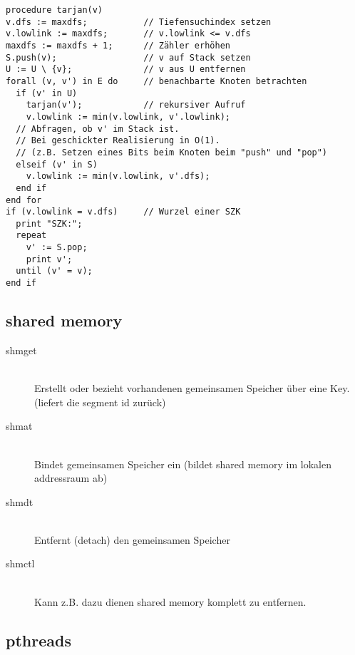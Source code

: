 \begin{verbatim}
procedure tarjan(v)
v.dfs := maxdfs;           // Tiefensuchindex setzen
v.lowlink := maxdfs;       // v.lowlink <= v.dfs
maxdfs := maxdfs + 1;      // Zähler erhöhen
S.push(v);                 // v auf Stack setzen
U := U \ {v};              // v aus U entfernen
forall (v, v') in E do     // benachbarte Knoten betrachten
  if (v' in U)
    tarjan(v');            // rekursiver Aufruf
    v.lowlink := min(v.lowlink, v'.lowlink);
  // Abfragen, ob v' im Stack ist. 
  // Bei geschickter Realisierung in O(1).
  // (z.B. Setzen eines Bits beim Knoten beim "push" und "pop") 
  elseif (v' in S)
    v.lowlink := min(v.lowlink, v'.dfs);
  end if
end for
if (v.lowlink = v.dfs)     // Wurzel einer SZK
  print "SZK:";
  repeat
    v' := S.pop;
    print v';
  until (v' = v);
end if
\end{verbatim}

\subsection{shared memory}

\begin{description}
\item [shmget] \hfill \\ Erstellt oder bezieht vorhandenen gemeinsamen Speicher über eine Key. (liefert die segment id zurück)
\item [shmat] \hfill \\ Bindet gemeinsamen Speicher ein (bildet shared memory im lokalen addressraum ab)
\item [shmdt] \hfill \\ Entfernt (detach) den gemeinsamen Speicher
\item [shmctl] \hfill \\ Kann z.B. dazu dienen shared memory komplett zu entfernen.
\end{description}

\subsection{pthreads}

